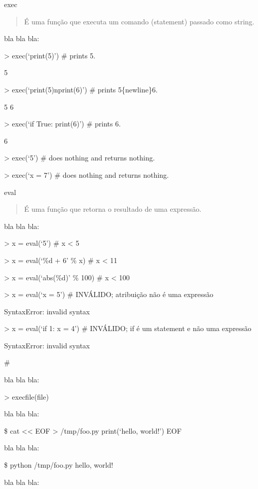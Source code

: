 \documentclass[letterpaper,10pt,brazil]{sphinxmanual}
\begin{document}
exec
\begin{quote}

É uma função que executa um comando (statement) passado como string.
\end{quote}

bla bla bla:

\textgreater{} exec(‘print(5)’)  \# prints 5.

5

\textgreater{} exec(‘print(5)nprint(6)’)  \# prints 5\{newline\}6.

5
6

\textgreater{} exec(‘if True: print(6)’)  \# prints 6.

6

\textgreater{} exec(‘5’)  \# does nothing and returns nothing.

\textgreater{} exec(‘x = 7’)  \# does nothing and returns nothing.

eval
\begin{quote}

É uma função que retorna o resultado de uma expressão.
\end{quote}

bla bla bla:

\textgreater{} x = eval(‘5’)  \# x \textless{}\sphinxhyphen{} 5

\textgreater{} x = eval(‘\%d + 6’ \% x)  \# x \textless{}\sphinxhyphen{} 11

\textgreater{} x = eval(‘abs(\%d)’ \% \sphinxhyphen{}100)  \# x \textless{}\sphinxhyphen{} 100

\textgreater{} x = eval(‘x = 5’)  \# INVÁLIDO; atribuição não é uma expressão

SyntaxError: invalid syntax

\textgreater{} x = eval(‘if 1: x = 4’)  \# INVÁLIDO; if é um statement e não uma expressão

SyntaxError: invalid syntax

\# 

bla bla bla:

\textgreater{} execfile(file)

bla bla bla:

\$ cat \textless{}\textless{} EOF \textgreater{} /tmp/foo.py
print(‘hello, world!’)
EOF

bla bla bla:

\$ python /tmp/foo.py
hello, world!

bla bla bla:
\end{document}
